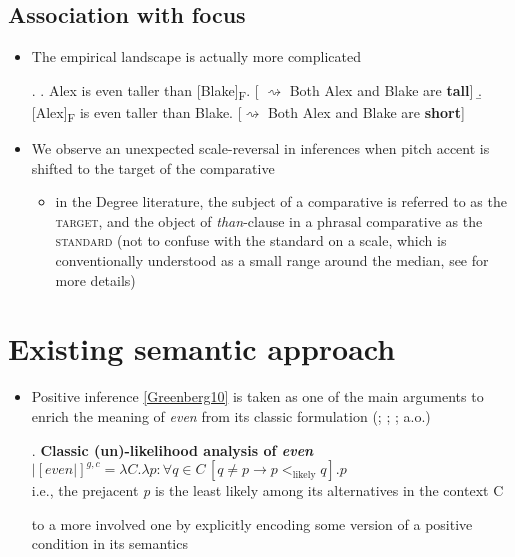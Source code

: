 \documentclass[11pt,letterpaper]{scrartcl}
\newcommand{\alignright}{\hspace*{\fill}}
\newcommand{\infer}{$\rightsquigarrow$ }
\begin{document}

\subsection{Association with focus}

\begin{itemize}
    \item The empirical landscape is actually more complicated
    
    \ex.\label{even-base} \a. Alex is even taller than [Blake]\textsubscript{F}.  %
    \alignright [ \infer Both Alex and Blake are \textbf{tall}] \label{even-base-objF}
    \b. [Alex]\textsubscript{F} is even taller than Blake. %
    \alignright [\infer Both Alex and Blake are \textbf{short}] \label{even-base-subF}
    
    \item We observe an unexpected scale-reversal in inferences when pitch accent is shifted to the target of the comparative
    
    \begin{itemize}
        \item {} in the Degree literature, the subject of a comparative is referred to as the \textsc{target}, and the object of \textit{than}-clause in a phrasal comparative as the \textsc{standard} (not to confuse with the standard on a scale, which is conventionally understood as a small range around the median, see \cite{solt_notes_2011} for more details)
    \end{itemize}
    
    
\end{itemize}

\section{Existing semantic approach}

\begin{itemize}
    \item Positive inference \ref{Greenberg10} is taken as one of the main arguments to enrich the meaning of \textit{even} from its classic formulation (\cite{karttunen_conventional_1979}; \cite{rooth_theory_1992}; \cite{chierchia_logic_2013}; a.o.)

    \ex.\label{classicunlikelihood} \textbf{Classic (un)-likelihood analysis of \textit{even}} \\
        $|[\textit{even}|]^{g, c} = \lambda C. \lambda p : \forall q \in C \, [q \neq p \rightarrow p <_{\text{likely}} q]. p$ \\
        i.e., the prejacent \textit{p} is the least likely among its alternatives in the context C
    
    to a more involved one by explicitly encoding some version of a positive condition in its semantics
    
\end{itemize}
\end{document}
